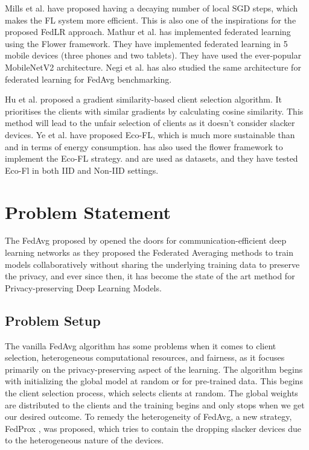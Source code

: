 \documentclass[conference]{IEEEtran}
\begin{document}
Mills et al. \cite{mills2023faster} have proposed having a decaying number of local SGD steps, which makes the FL system more efficient. This is also one of the inspirations for the proposed FedLR approach. Mathur et al. \cite{mathur2021device} has implemented federated learning using the Flower framework. They have implemented federated learning in 5 mobile devices (three phones and two tablets). They have used the ever-popular MobileNetV2 \cite{sandler2018mobilenetv2} architecture. Negi et al. \cite{negi2023study} has also studied the same \cite{sandler2018mobilenetv2} architecture for federated learning for FedAvg benchmarking. 
\par  
Hu et al. \cite{hu2025federated} proposed a gradient similarity-based client selection algorithm. It prioritises the clients with similar gradients by calculating cosine similarity. This method will lead to the unfair selection of clients as it doesn't consider slacker devices. Ye et al. \cite{ye2022eco} have proposed Eco-FL, which is much more sustainable than \cite{mcmahan2017communication} and \cite{li2020federated} in terms of energy consumption. \cite{ye2022eco} has also used the flower framework to implement the Eco-FL strategy. \cite{cifar10} and \cite{Krizhevsky09learningmultiple} are used as datasets, and they have tested Eco-Fl in both IID and Non-IID settings. 

\section{Problem Statement}
The FedAvg proposed by \cite{mcmahan2017communication} opened the doors for communication-efficient deep learning networks as they proposed the Federated Averaging methods to train models collaboratively without sharing the underlying training data to preserve the privacy, and ever since then, it has become the state of the art method for Privacy-preserving Deep Learning Models. 
\subsection{Problem Setup} 
The vanilla FedAvg algorithm has some problems when it comes to client selection, heterogeneous computational resources, and fairness, as it focuses primarily on the privacy-preserving aspect of the learning. The algorithm begins with initializing the global model at random or for pre-trained data. This begins the client selection process, which selects clients at random. The global weights are distributed to the clients and the training begins and only stops when we get our desired outcome. To remedy the heterogeneity of FedAvg, a new strategy, FedProx \cite{li2020federated}, was proposed, which tries to contain the dropping slacker devices due to the heterogeneous nature of the devices.
\end{document}

